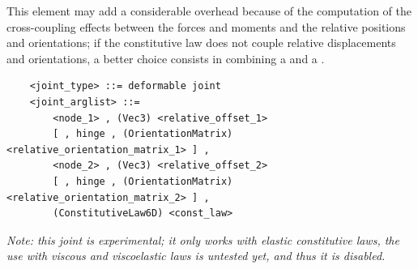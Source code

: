 \noindent
This element may add a considerable overhead because of the computation
of the cross-coupling effects between the forces and moments and the
relative positions and orientations; if the constitutive law does not couple
relative displacements and orientations, a better choice consists 
in combining a  and a .
\begin{verbatim}
    <joint_type> ::= deformable joint
    <joint_arglist> ::= 
        <node_1> , (Vec3) <relative_offset_1>
        [ , hinge , (OrientationMatrix) <relative_orientation_matrix_1> ] ,
        <node_2> , (Vec3) <relative_offset_2>
        [ , hinge , (OrientationMatrix) <relative_orientation_matrix_2> ] ,
        (ConstitutiveLaw6D) <const_law>
\end{verbatim}
\emph{Note: this joint is experimental; it only works with elastic 
constitutive laws, the use with viscous and viscoelastic laws 
is untested yet, and thus it is disabled.}

